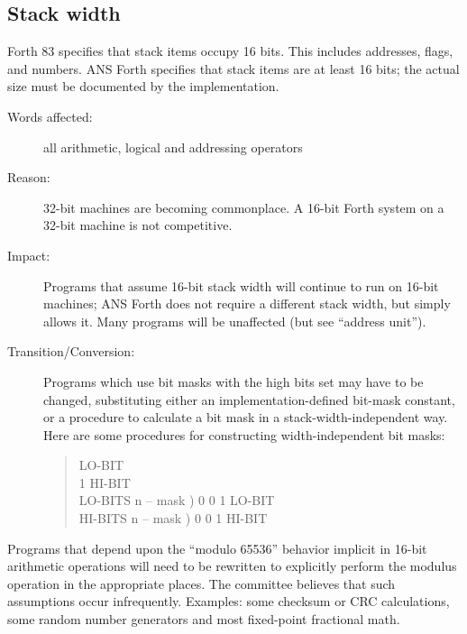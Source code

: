 \subsection{Stack width} %

Forth 83 specifies that stack items occupy 16 bits. This includes
addresses, flags, and numbers. ANS Forth specifies that stack items
are at least 16 bits; the actual size must be documented by the
implementation.

\begin{description}
\item[Words affected:]
	all arithmetic, logical and addressing operators

\item[Reason:]
	32-bit machines are becoming commonplace. A 16-bit Forth
	system on a 32-bit machine is not competitive.

\item[Impact:]
	Programs that assume 16-bit stack width will continue to run on
	16-bit machines; ANS Forth does not require a different stack
	width, but simply allows it. Many programs will be unaffected
	(but see ``address unit'').

\item[Transition/Conversion:]
	Programs which use bit masks with the high bits set may have to
	be changed, substituting either an implementation-defined bit-mask
	constant, or a procedure to calculate a bit mask in a
	stack-width-independent way. Here are some procedures for
	constructing width-independent bit masks:
	\begin{quote}  LO-BIT \\
		 1 
			\quad {}
			\quad {} HI-BIT \\
		\word{:} LO-BITS  n -- mask )
			0 	0 
				1 		LO-BIT 
		\word{;} \\
		\word{:} HI-BITS  n -- mask )
			0 	0 
				1 	HI-BIT 
		\word{;} \\
	\end{quote}
\end{description}

Programs that depend upon the ``modulo 65536'' behavior implicit in
16-bit arithmetic operations will need to be rewritten to explicitly
perform the modulus operation in the appropriate places. The committee
believes that such assumptions occur infrequently. Examples: some
checksum or CRC calculations, some random number generators and most
fixed-point fractional math.

